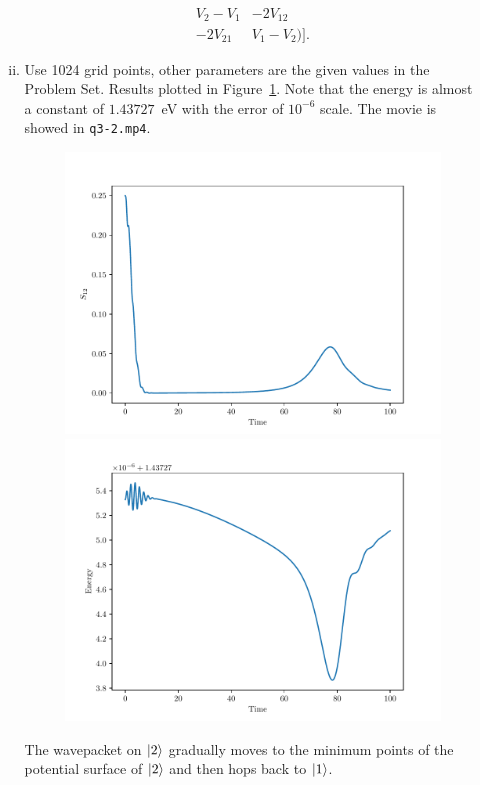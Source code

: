 \documentclass{article}
\begin{document}
\begin{enumerate}[1.]
\begin{enumerate}[(i)]
\begin{align*}
          V_2 - V_1 & -2V_{12} \\
          -2V_{21} & V_1 - V_2
        )
      ].
    \end{align*}
    \item Use 1024 grid points, other parameters are the given values in the Problem Set.
    Results plotted in Figure~\ref{fig:3-2}. Note that the energy is almost a constant of $1.43727$~eV with the error of $10^{-6}$ scale.
    The movie is showed in \texttt{q3-2.mp4}.
    \begin{figure}[H]
      \centering
      \begin{minipage}{0.48\linewidth}
        \centering
        \includegraphics[width=\linewidth]{q3-2_time_s12b.pdf}
      \end{minipage}
      \begin{minipage}{0.48\linewidth}
        \centering
        \includegraphics[width=\linewidth]{q3-2_time_energy.pdf}
      \end{minipage}
      \caption{}
      \label{fig:3-2}
    \end{figure}
    The wavepacket on $\ket{2}$ gradually moves to the minimum points of the potential surface of $\ket{2}$ and then hops back to $\ket{1}$.


\end{enumerate}
\end{enumerate}
\end{document}
